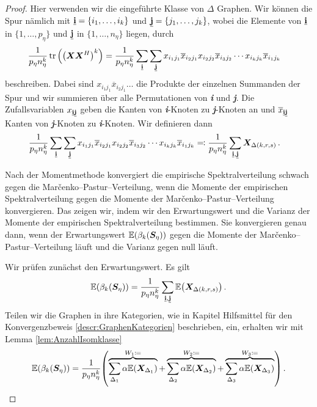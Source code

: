 \documentclass[../Bachelor_LennartKoliwer.tex]{subfiles}
\begin{document}
\begin{proof}
    Hier verwenden wir die eingeführte Klasse von $\Delta$ Graphen.
    Wir können die Spur nämlich mit $\emph{\textbf{i}}=\{i_1,\dots,i_k\}$ und $\emph{\textbf{j}}=\{j_1,\dots,j_k\}$, wobei die Elemente von $\emph{\textbf{i}}$ in $\{1,\dots,p_\eta\}$ und $\emph{\textbf{j}}$ in $\{1,\dots,n_\eta\}$ liegen, durch 
    \begin{align*}
            \frac{1}{p_\eta n_\eta^k}\tr\lr{\lr{\bm{X}\bm{X}^H}^k} &= \frac{1}{p_\eta n_\eta^k}\sum_{\emph{\textbf{i}}}\sum_{\emph{\textbf{j}}}x_{i_1j_1}\overline{x}_{i_2j_1}x_{i_2j_2}\overline{x}_{i_3j_2}\cdots x_{i_kj_k}\overline{x}_{i_1j_k}
    \end{align*}
    beschreiben.
    Dabei sind $x_{i_1j_1}\overline{x}_{i_2j_1}\dots$ die Produkte der einzelnen Summanden der Spur und wir summieren über alle Permutationen von \emph{\textbf{i}} und \emph{\textbf{j}}.
    Die Zufallsvariablen $x_{\emph{\textbf{i}}\emph{\textbf{j}}}$ geben die Kanten von \emph{\textbf{i}}-Knoten zu \emph{\textbf{j}}-Knoten an und $\overline{x}_{\emph{\textbf{i}}\emph{\textbf{j}}}$ Kanten von \emph{\textbf{j}}-Knoten zu \emph{\textbf{i}}-Knoten.
    Wir definieren dann
    \begin{align*}
        \frac{1}{p_\eta n_\eta^k}\sum_{\emph{\textbf{i}}}\sum_{\emph{\textbf{j}}}x_{i_1j_1}\overline{x}_{i_2j_1}x_{i_2j_2}\overline{x}_{i_3j_2}\cdots x_{i_kj_k}\overline{x}_{i_1j_k} & \eqqcolon \frac{1}{p_\eta n_\eta^k} \sum_{\emph{\textbf{i}},\emph{\textbf{j}}} \bm{X}_{\Delta(k,r,s)}\,.
    \end{align*}

    Nach der Momentmethode konvergiert die empirische Spektralverteilung schwach gegen die Mar\v{c}enko--Pastur--Verteilung, wenn die Momente der empirischen Spektralverteilung gegen die Momente der Mar\v{c}enko--Pastur--Verteilung konvergieren.
    Das zeigen wir, indem wir den Erwartungswert und die Varianz der Momente der empirischen Spektralverteilung bestimmen.
    Sie konvergieren genau dann, wenn der Erwartungswert $\mathbb{E}(\beta_k(\bm{S}_\eta))$ gegen die Momente der Mar\v{c}enko--Pastur--Verteilung läuft und die Varianz gegen null läuft.
    
    Wir prüfen zunächst den Erwartungswert.
    Es gilt
    \begin{align*}
        \EE(\beta_k(\bm{S}_\eta)) = \frac{1}{p_\eta n_\eta^k} \sum_{\emph{\textbf{i}},\emph{\textbf{j}}}\EE\lr{\bm{X}_{\Delta(k,r,s)}}\,.
    \end{align*}
    Teilen wir die Graphen in ihre Kategorien, wie in Kapitel Hilfsmittel für den Konvergenzbeweis \ref{descr:GraphenKategorien} beschrieben, ein, erhalten wir mit Lemma \ref{lem:AnzahlIsomklasse}
    \begin{align*}
        \EE(\beta_k(\bm{S}_\eta)) = \frac{1}{p_\eta n_\eta^k} \lr{\overbrace{\sum_{\Delta_1} \alpha\EE\lr{\bm{X}_{\Delta_1}}}^{W_1\coloneqq}+\overbrace{\sum_{\Delta_2} \alpha\EE\lr{\bm{X}_{\Delta_2}}}^{W_2\coloneqq}+\overbrace{\sum_{\Delta_3} \alpha\EE\lr{\bm{X}_{\Delta_3}}}^{W_3\coloneqq}}\,.
    \end{align*}


\end{proof}
\end{document}
